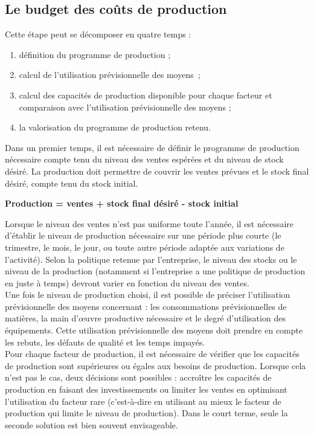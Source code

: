 \documentclass{kaobook}
\begin{document}
\subsection{Le budget des coûts de production}
\label{sec:org8249d57}
Cette étape peut se décomposer en quatre temps :\\
\begin{enumerate}
\item définition du programme de production ;\\
\item calcul de l'utilisation prévisionnelle des moyens ;\\
\item calcul des capacités de production disponible pour chaque facteur et comparaison avec l'utilisation prévisionnelle des moyens ;\\
\item la valorisation du programme de production retenu.\\
\end{enumerate}
Dans un premier temps, il est nécessaire de définir le programme de production nécessaire compte tenu du niveau des ventes espérées et du niveau de stock désiré. La production doit permettre de couvrir les ventes prévues et le stock final désiré, compte tenu du stock initial.\\
\begin{center}
\textbf{Production = ventes + stock final désiré - stock initial}\\
\end{center}
Lorsque le niveau des ventes n'est pas uniforme toute l'année, il est nécessaire d'établir le niveau de production nécessaire sur une période plus courte (le trimestre, le mois, le jour, ou toute autre période adaptée aux variations de l'activité). Selon la politique retenue par l'entreprise, le niveau des stocks ou le niveau de la production (notamment si l'entreprise a une politique de production en juste à temps) devront varier en fonction du niveau des ventes.\\
Une fois le niveau de production choisi, il est possible de préciser l'utilisation prévisionnelle des moyens concernant : les consommations prévisionnelles de matières, la main d'œuvre productive nécessaire et le degré d'utilisation des équipements. Cette utilisation prévisionnelle des moyens doit prendre en compte les rebuts, les défauts de qualité et les temps impayés.\\
Pour chaque facteur de production, il est nécessaire de vérifier que les capacités de production sont supérieures ou égales aux besoins de production. Lorsque cela n'est pas le cas, deux décisions sont possibles : accroître les capacités de production en faisant des investissements ou limiter les ventes en optimisant l'utilisation du facteur rare (c'est-à-dire en utilisant au mieux le facteur de production qui limite le niveau de production). Dans le court terme, seule la seconde solution est bien souvent envisageable.\\
\end{document}
